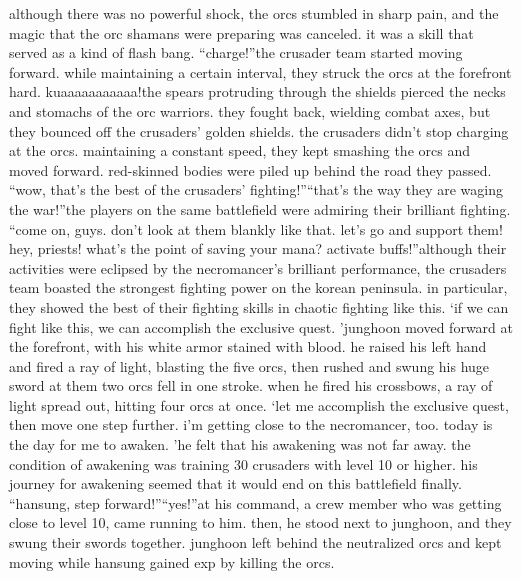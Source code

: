 although there was no powerful shock, the orcs stumbled in sharp pain, and the magic that the orc shamans were preparing was canceled.
 it was a skill that served as a kind of flash bang.
“charge!”the crusader team started moving forward.
 while maintaining a certain interval, they struck the orcs at the forefront hard.
kuaaaaaaaaaaa!the spears protruding through the shields pierced the necks and stomachs of the orc warriors.
they fought back, wielding combat axes, but they bounced off the crusaders’ golden shields.
the crusaders didn’t stop charging at the orcs.
 maintaining a constant speed, they kept smashing the orcs and moved forward.
 red-skinned bodies were piled up behind the road they passed.
“wow, that’s the best of the crusaders’ fighting!”“that’s the way they are waging the war!”the players on the same battlefield were admiring their brilliant fighting.
“come on, guys.
 don’t look at them blankly like that.
 let’s go and support them! hey, priests! what’s the point of saving your mana? activate buffs!”although their activities were eclipsed by the necromancer’s brilliant performance, the crusaders team boasted the strongest fighting power on the korean peninsula.
 in particular, they showed the best of their fighting skills in chaotic fighting like this.
‘if we can fight like this, we can accomplish the exclusive quest.
’junghoon moved forward at the forefront, with his white armor stained with blood.
he raised his left hand and fired a ray of light, blasting the five orcs, then rushed and swung his huge sword at them two orcs fell in one stroke.
when he fired his crossbows, a ray of light spread out, hitting four orcs at once.
‘let me accomplish the exclusive quest, then move one step further.
 i’m getting close to the necromancer, too.
 today is the day for me to awaken.
’he felt that his awakening was not far away.
 the condition of awakening was training 30 crusaders with level 10 or higher.
 his journey for awakening seemed that it would end on this battlefield finally.
“hansung, step forward!”“yes!”at his command, a crew member who was getting close to level 10, came running to him.
then, he stood next to junghoon, and they swung their swords together.
 junghoon left behind the neutralized orcs and kept moving while hansung gained exp by killing the orcs.

